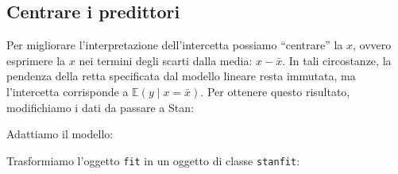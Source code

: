 \documentclass[
  11pt,
]{krantz}
\makeatletter
\newenvironment{Shaded}{\begin{snugshade}}{\end{snugshade}}
\newcommand{\AttributeTok}[1]{\textcolor[rgb]{0.61,0.61,0.61}{#1}}
\newcommand{\DecValTok}[1]{\textcolor[rgb]{0.06,0.06,0.06}{#1}}
\newcommand{\FunctionTok}[1]{\textcolor[rgb]{0,0,0}{#1}}
\newcommand{\NormalTok}[1]{#1}
\newcommand{\OtherTok}[1]{\textcolor[rgb]{0.37,0.37,0.37}{#1}}
\newcommand{\SpecialCharTok}[1]{\textcolor[rgb]{0,0,0}{#1}}
\newenvironment{kframe}{%
\medskip{}
\setlength{\fboxsep}{.8em}
 \def\at@end@of@kframe{}%
 \ifinner\ifhmode%
  \def\at@end@of@kframe{\end{minipage}}%
  \begin{minipage}{\columnwidth}%
 \fi\fi%
 \def\FrameCommand##1{\hskip\@totalleftmargin \hskip-\fboxsep
 \colorbox{shadecolor}{##1}\hskip-\fboxsep
     \hskip-\linewidth \hskip-\@totalleftmargin \hskip\columnwidth}%
 \MakeFramed {\advance\hsize-\width
   \@totalleftmargin\z@ \linewidth\hsize
   \@setminipage}}%
 {\par\unskip\endMakeFramed%
 \at@end@of@kframe}
\renewenvironment{Shaded}{\begin{kframe}}{\end{kframe}}
\newcommand{\E}{\mathbb{E}} %
\makeatother
\begin{document}
\hypertarget{centrare-i-predittori}{%
\subsection{Centrare i predittori}\label{centrare-i-predittori}}

Per migliorare l'interpretazione dell'intercetta possiamo ``centrare'' la \(x\), ovvero esprimere la \(x\) nei termini degli scarti dalla media: \(x - \bar{x}\). In tali circostanze, la pendenza della retta specificata dal modello lineare resta immutata, ma l'intercetta corrisponde a \(\E(y \mid x = \bar{x})\). Per ottenere questo risultato, modifichiamo i dati da passare a Stan:

\begin{Shaded}
\end{Shaded}

Adattiamo il modello:

\begin{Shaded}
\end{Shaded}

Trasformiamo l'oggetto \texttt{fit} in un oggetto di classe \texttt{stanfit}:

\begin{Shaded}
\end{Shaded}
\end{document}
